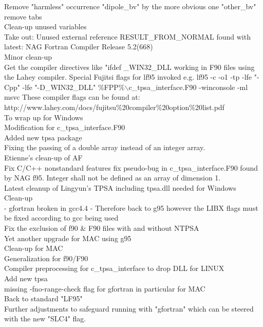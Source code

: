 Remove "harmless" occurrence "dipole\_bv" by the more obvious one "other\_bv"  \\ 
remove tabs  \\ 
Clean-up unused variables  \\ 
Take out:  Unused external reference RESULT\_FROM\_NORMAL found with latest: NAG Fortran Compiler Release 5.2(668)  \\ 
Minor clean-up  \\ 
Get the compiler directives like "ifdef \_WIN32\_DLL working in F90 files using the Lahey compiler. Special Fujitsi flags for lf95 invoked e.g. lf95 -c -o1 -tp -lfe "-Cpp" -lfe "-D\_WIN32\_DLL" \%FPP\%$\backslash$c\_tpsa\_interface.F90 -winconsole -ml msvc  These compiler flags can be found at:  http://www.lahey.com/docs/fujitsu\%20compiler\%20option\%20list.pdf  \\ 
To wrap up for Windows  \\ 
Modification for c\_tpsa\_interface.F90  \\ 
Added new tpsa package  \\ 
Fixing the passing of a double array instead of an integer array.  \\ 
Etienne's clean-up of AF  \\ 
Fix C/C++ nonstandard features fix pseudo-bug in c\_tpsa\_interface.F90 found by NAG f95. Integer shall not be defined as an array of dimension 1.  \\ 
Latest cleanup of Lingyun's TPSA including tpsa.dll needed for Windows  \\ 
Clean-up  \\ 
- gfortran broken in gcc4.4 - Therefore back to g95 however the LIBX flags must be fixed according to gcc being used  \\ 
Fix the exclusion of f90 \& F90 files with and without NTPSA  \\ 
Yet another upgrade for MAC using g95  \\ 
Clean-up for MAC  \\ 
Generalization for f90/F90  \\ 
Compiler preprocessing for c\_tpsa\_interface to drop DLL for LINUX  \\ 
Add new tpsa  \\ 
missing  -fno-range-check flag for gfortran in particular for MAC  \\ 
Back to standard "LF95"  \\ 
Further adjustments to safeguard running with "gfortran" which can be steered with the new "SLC4" flag.  \\ 
